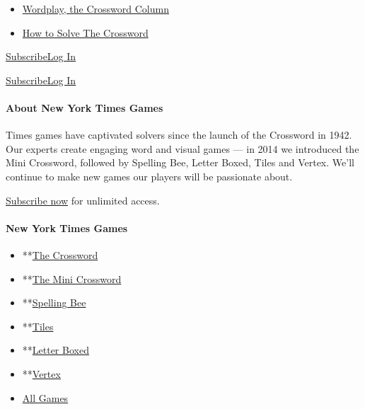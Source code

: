 \begin{itemize}
\tightlist
\item
  \href{https://www.nytimes.com/column/wordplay}{Wordplay, the Crossword
  Column}
\item
  \href{https://www.nytimes.com/guides/crosswords/how-to-solve-a-crossword-puzzle}{How
  to Solve The Crossword}
\end{itemize}

\href{https://www.nytimes.com/subscription/games?campaignId=9HH7K}{Subscribe}\href{https://myaccount.nytimes.com/auth/login?application=crosswords\&asset=navigation-drawer\&client_id=games\&redirect_uri=\&response_type=cookie}{Log
In}

\href{https://www.nytimes.com/subscription/games?campaignId=9JF99}{Subscribe}\href{https://myaccount.nytimes.com/auth/login?application=crosswords\&asset=navigation-bar\&client_id=games\&redirect_uri=\&response_type=cookie}{Log
In}

\hypertarget{about-new-york-times-games}{%
\paragraph{About New York Times
Games}\label{about-new-york-times-games}}

Times games have captivated solvers since the launch of the Crossword in
1942. Our experts create engaging word and visual games --- in 2014 we
introduced the Mini Crossword, followed by Spelling Bee, Letter Boxed,
Tiles and Vertex. We'll continue to make new games our players will be
passionate about.

\href{https://www.nytimes.com/subscription/games?campaignId=9W9LL}{Subscribe
now} for unlimited access.

\hypertarget{new-york-times-games-1}{%
\paragraph{New York Times Games}\label{new-york-times-games-1}}

\begin{itemize}
\tightlist
\item
  **\href{/crosswords/game/daily}{The Crossword}
\item
  **\href{/crosswords/game/mini}{The Mini Crossword}
\item
  **\href{/puzzles/spelling-bee}{Spelling Bee}
\item
  **\href{/puzzles/tiles}{Tiles}
\item
  **\href{/puzzles/letter-boxed}{Letter Boxed}
\item
  **\href{/puzzles/vertex}{Vertex}
\item
  \href{/crosswords}{All Games}
\end{itemize}

